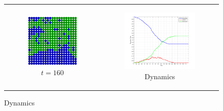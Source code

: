 \begin{figure}
\begin{center}
\begin{tabular}{c c}
    	\\
    	
		\begin{subfigure}[b]{0.3\textwidth}
			\centering
			\includegraphics[width=1\textwidth, angle=0]{./fig/step5_environment/SIR_environment_30x30agents_t160_01dt.png}
			\caption{$t = 160$}
			\label{fig:sir_env_t160}
		\end{subfigure}
		& 
		\begin{subfigure}[b]{0.3\textwidth}
			\centering
			\includegraphics[width=1\textwidth, angle=0]{./fig/step5_environment/SIR_dynamics_30x30agents_300t_01dt.png}
			\caption{Dynamics}
			\label{fig:sir_dynamics_30x30agents_300t_01dt}
		\end{subfigure}
	\end{tabular}
	

\end{center}
\end{figure}
